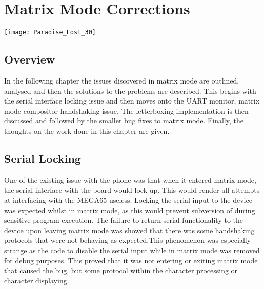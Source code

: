 
\chapter{Matrix Mode Corrections} %

\label{Chapter 5} %

\texttt{[image: Paradise\_Lost\_30]}

\section{Overview}

In the following chapter the issues discovered in matrix mode are outlined, analysed and then the solutions to the problems are described. This begins with the serial interface locking issue and then moves onto the UART monitor, matrix mode compositor handshaking issue. The letterboxing implementation is then discussed and followed by the smaller bug fixes to matrix mode. Finally, the thoughts on the work done in this chapter are given.


\section{Serial Locking}

\label{Ch5 Sec1}

One of the existing issue with the phone was that when it entered matrix mode, the serial interface with the board would lock up. This would render all attempts at interfacing with the MEGA65 useless. Locking the serial input to the device was expected whilst in matrix mode, as this would prevent subversion of during sensitive program execution. The failure to return serial functionality to the device upon leaving matrix mode was showed that there was some handshaking protocols that were not behaving as expected.This phenomenon was especially strange as the code to disable the serial input while in matrix mode was removed for debug purposes. This proved that it was not entering or exiting matrix mode that caused the bug, but some protocol within the character processing or character displaying.

